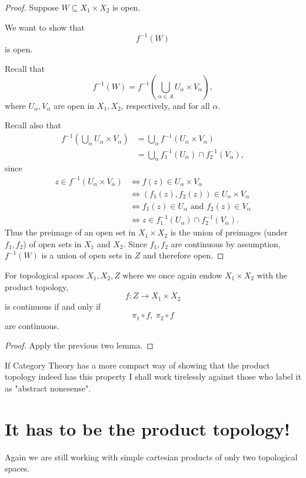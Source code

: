 \begin{proof}
    Suppose $W \subseteq X_1 \times X_2$ is open. 

    We want to show that 
    \[
        f^{-1}(W) 
    \]
    is open. 

    Recall that 
    \[
        f^{-1}(W) = f^{-1}\left(\bigcup_{\alpha \in A}U_\alpha 
        \times V_\alpha\right),
    \]
    where $U_\alpha, V_\alpha$ are open in $X_1, X_2$, respectively, 
    and for all $\alpha$.

    Recall also that 
    \begin{align*}
        f^{-1}\left(\bigcup_{\alpha} U_\alpha \times V_\alpha\right)
        &= \bigcup_{\alpha} f^{-1}(U_\alpha \times V_\alpha) \\ 
        &= \bigcup_{\alpha} f_1^{-1}(U_\alpha) \cap f_2^{-1}(V_\alpha),
    \end{align*}
    since 
    \begin{align*}
        z\in f^{-1}(U_\alpha\times V_\alpha)
            &\iff f(z)\in U_\alpha\times V_\alpha\\
            &\iff (f_1(z),f_2(z))\in U_\alpha\times V_\alpha\\
            &\iff f_1(z)\in U_\alpha\text{ and }f_2(z)\in V_\alpha\\
            &\iff z\in f_1^{-1}(U_\alpha)\cap f_2^{-1}(V_\alpha).
    \end{align*}
    Thus the preimage of an open set in $X_1 \times X_2$ is 
    the union of preimages (under $f_1,f_2$) of 
    open sets in $X_1$ and $X_2$. Since $f_1,f_2$ are continuous 
    by assumption, 
    $f^{-1}(W)$ is a union of open sets in $Z$ and therefore open.
\end{proof}

\begin{thm*}
    For topological spaces $X_1,X_2,Z$ where we once again 
    endow $X_1\times X_2$ with the product topology, 
    \[
        f : Z \to X_1 \times X_2
    \]
    is continuous if and only if 
    \[
        \pi_1 \circ f, \ \pi_2 \circ f
    \]
    are continuous. 
\end{thm*}
\begin{proof}
    Apply the previous two lemma. 
\end{proof}

If Category Theory has a more compact way of showing 
that the product topology indeed has this property I shall 
work tirelessly against those who label it as "abstract nonesense". 

\section*{It has to be the product topology!}
Again we are still working with simple 
cartesian products of only two topological spaces. 

